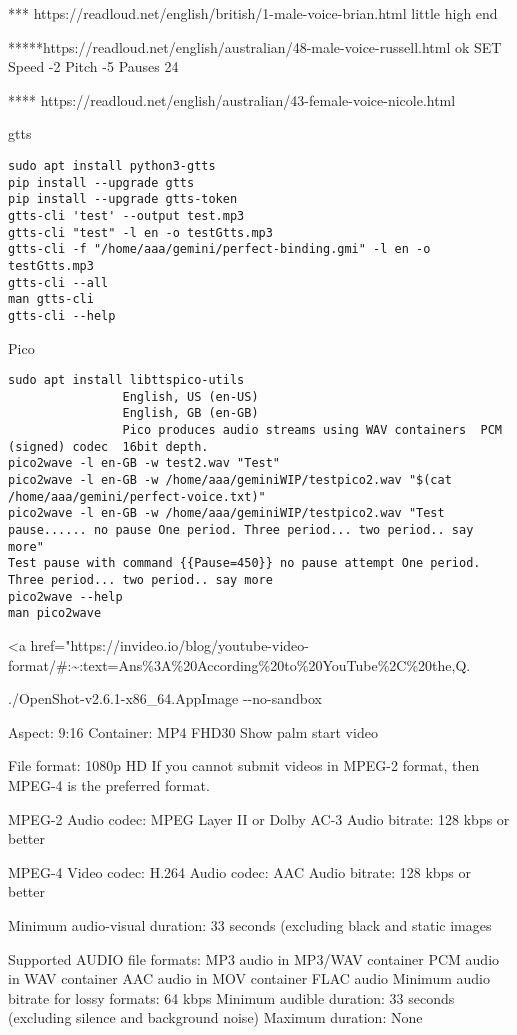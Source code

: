 \documentclass[
]{article}
\begin{document}
*** https://readloud.net/english/british/1-male-voice-brian.html little
high end

*****https://readloud.net/english/australian/48-male-voice-russell.html
ok SET Speed -2 Pitch -5 Pauses 24

**** https://readloud.net/english/australian/43-female-voice-nicole.html

gtts

\begin{verbatim}
sudo apt install python3-gtts
pip install --upgrade gtts
pip install --upgrade gtts-token
gtts-cli 'test' --output test.mp3
gtts-cli "test" -l en -o testGtts.mp3
gtts-cli -f "/home/aaa/gemini/perfect-binding.gmi" -l en -o testGtts.mp3
gtts-cli --all
man gtts-cli
gtts-cli --help
\end{verbatim}

Pico

\begin{verbatim}
sudo apt install libttspico-utils
                English, US (en-US)
                English, GB (en-GB)
                Pico produces audio streams using WAV containers  PCM (signed) codec  16bit depth.
pico2wave -l en-GB -w test2.wav "Test"
pico2wave -l en-GB -w /home/aaa/geminiWIP/testpico2.wav "$(cat /home/aaa/gemini/perfect-voice.txt)"
pico2wave -l en-GB -w /home/aaa/geminiWIP/testpico2.wav "Test pause...... no pause One period. Three period... two period.. say more"
Test pause with command {{Pause=450}} no pause attempt One period. Three period... two period.. say more
pico2wave --help
man pico2wave
\end{verbatim}

\textless a
href="https://invideo.io/blog/youtube-video-format/\#:\textasciitilde:text=Ans\%3A\%20According\%20to\%20YouTube\%2C\%20the,Q.

./OpenShot-v2.6.1-x86\_64.AppImage -\/-no-sandbox

Aspect: 9:16 Container: MP4 FHD30 Show palm start video

File format: 1080p HD If you cannot submit videos in MPEG-2 format, then
MPEG-4 is the preferred format.

MPEG-2 Audio codec: MPEG Layer II or Dolby AC-3 Audio bitrate: 128 kbps
or better

MPEG-4 Video codec: H.264 Audio codec: AAC Audio bitrate: 128 kbps or
better

Minimum audio-visual duration: 33 seconds (excluding black and static
images

Supported AUDIO file formats: MP3 audio in MP3/WAV container PCM audio
in WAV container AAC audio in MOV container FLAC audio Minimum audio
bitrate for lossy formats: 64 kbps Minimum audible duration: 33 seconds
(excluding silence and background noise) Maximum duration: None
\end{document}
